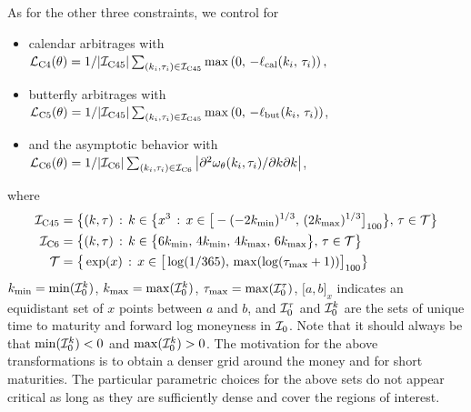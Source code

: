 As for the other three constraints, we control for
\begin{itemize}
\item calendar arbitrages with ${\mathcal L}_{\rm C4} (\theta) = 1/|{{\mathcal I}_{\rm C45}}| \sum_{(k_i,\tau_i)\in{{\mathcal I}_{\rm C45}}} \max\left(0, \, - \ell_{\rm cal}(k_i,\,\tau_i) \right),$
\item butterfly arbitrages with ${\mathcal L}_{\rm C5} (\theta) = 1/|{{\mathcal I}_{\rm C45}}| \sum_{(k_i,\tau_i)\in{{\mathcal I}_{\rm C45}}}  \max\left(0, \, -\ell_{\rm but}(k_i,\,\tau_i)\right)$,
\item and the asymptotic behavior with ${\mathcal L}_{\rm C6} (\theta) = 1/|{{\mathcal I}_{\rm C6}}| \sum_{(k_i,\tau_i)\in{{\mathcal I}_{\rm C6}}} \left\lvert \partial^2 \omega_{\theta}(k_i,\tau_i)/\partial k \partial k \right\rvert$,
\end{itemize}
where 
\begin{align*}
{{\mathcal I}_{\rm C45}} &= \big\{(k,\tau) \, : \, k\in \big\{ x^3 \,:\, x \in \big\lbrack -(-2 k_{\min})^{1/3}, \, (2k_{\max})^{1/3} \big\rbrack_{100} \big\}, \,\tau \in {\mathcal T}\big\} \\
{{\mathcal I}_{\rm C6}} &= \big\{(k,\tau) \, : \, k\in \big\{6k_{\min}, \, 4k_{\min} , \, 4k_{\max}, \, 6k_{\max} \big\}, \,\tau \in {\mathcal T}\big\}\\
{\mathcal T} &= \big\{ \exp(x) \,:\, x \in \big\lbrack \log(1/365), \, \max( \log(\tau_{\max}+1)) \big\rbrack_{100} \big\}
\end{align*}
 $k_{\min} = \min({\mathcal I}_{\rm 0}^k)$, $k_{\max} = \max({\mathcal I}_{\rm 0}^k)$, $\tau_{\max} = \max({\mathcal I}_{\rm 0}^\tau)$, $\lbrack a,b \rbrack_{x}$ indicates an equidistant set of $x$ points between $a$ and $b$, and ${\mathcal I}_{\rm 0}^\tau$ and ${\mathcal I}_{\rm 0}^k$ are the sets of unique time to maturity and forward log moneyness in ${\mathcal I}_{\rm 0}$.
Note that it should always be that $\min({\mathcal I}_{\rm 0}^k)<0$ and $\max({\mathcal I}_{\rm 0}^k)>0$.
The motivation for the above transformations is to obtain a denser grid around the money and for short maturities.
The particular parametric choices for the above sets do not appear critical as long as they are sufficiently dense and cover the regions of interest.



